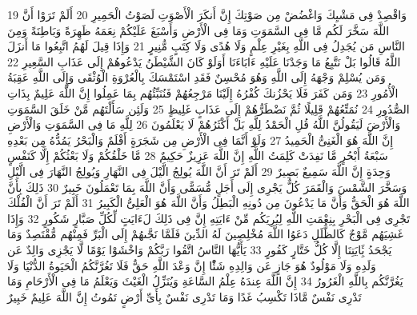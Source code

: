 \documentclass[20pt,a4paper]{article}
\begin{document}
{\tiny\colorbox{cl_aya}{19}} وَاقْصِدْ فِى مَشْيِكَ وَاغْضُضْ مِن صَوْتِكَ إِنَّ أَنكَرَ الْأَصْوَتِ لَصَوْتُ الْحَمِيرِ
{\tiny\colorbox{cl_aya}{20}} أَلَمْ تَرَوْا أَنَّ اللَّهَ سَخَّرَ لَكُم مَّا فِى السَّمَوَتِ وَمَا فِى الْأَرْضِ وَأَسْبَغَ عَلَيْكُمْ نِعَمَهُ ظَهِرَةً وَبَاطِنَةً وَمِنَ النَّاسِ مَن يُجَدِلُ فِى اللَّهِ بِغَيْرِ عِلْمٍ وَلَا هُدًى وَلَا كِتَبٍ مُّنِيرٍ
{\tiny\colorbox{cl_aya}{21}} وَإِذَا قِيلَ لَهُمُ اتَّبِعُوا مَا أَنزَلَ اللَّهُ قَالُوا بَلْ نَتَّبِعُ مَا وَجَدْنَا عَلَيْهِ ءَابَاءَنَا أَوَلَوْ كَانَ الشَّيْطَنُ يَدْعُوهُمْ إِلَى عَذَابِ السَّعِيرِ
{\tiny\colorbox{cl_aya}{22}} وَمَن يُسْلِمْ وَجْهَهُ إِلَى اللَّهِ وَهُوَ مُحْسِنٌ فَقَدِ اسْتَمْسَكَ بِالْعُرْوَةِ الْوُثْقَى وَإِلَى اللَّهِ عَقِبَةُ الْأُمُورِ
{\tiny\colorbox{cl_aya}{23}} وَمَن كَفَرَ فَلَا يَحْزُنكَ كُفْرُهُ إِلَيْنَا مَرْجِعُهُمْ فَنُنَبِّئُهُم بِمَا عَمِلُوا إِنَّ اللَّهَ عَلِيمٌ بِذَاتِ الصُّدُورِ
{\tiny\colorbox{cl_aya}{24}} نُمَتِّعُهُمْ قَلِيلًا ثُمَّ نَضْطَرُّهُمْ إِلَى عَذَابٍ غَلِيظٍ
{\tiny\colorbox{cl_aya}{25}} وَلَئِن سَأَلْتَهُم مَّنْ خَلَقَ السَّمَوَتِ وَالْأَرْضَ لَيَقُولُنَّ اللَّهُ قُلِ الْحَمْدُ لِلَّهِ بَلْ أَكْثَرُهُمْ لَا يَعْلَمُونَ
{\tiny\colorbox{cl_aya}{26}} لِلَّهِ مَا فِى السَّمَوَتِ وَالْأَرْضِ إِنَّ اللَّهَ هُوَ الْغَنِىُّ الْحَمِيدُ
{\tiny\colorbox{cl_aya}{27}} وَلَوْ أَنَّمَا فِى الْأَرْضِ مِن شَجَرَةٍ أَقْلَمٌ وَالْبَحْرُ يَمُدُّهُ مِن بَعْدِهِ سَبْعَةُ أَبْحُرٍ مَّا نَفِدَتْ كَلِمَتُ اللَّهِ إِنَّ اللَّهَ عَزِيزٌ حَكِيمٌ
{\tiny\colorbox{cl_aya}{28}} مَّا خَلْقُكُمْ وَلَا بَعْثُكُمْ إِلَّا كَنَفْسٍ وَحِدَةٍ إِنَّ اللَّهَ سَمِيعٌ بَصِيرٌ
{\tiny\colorbox{cl_aya}{29}} أَلَمْ تَرَ أَنَّ اللَّهَ يُولِجُ الَّيْلَ فِى النَّهَارِ وَيُولِجُ النَّهَارَ فِى الَّيْلِ وَسَخَّرَ الشَّمْسَ وَالْقَمَرَ كُلٌّ يَجْرِى إِلَى أَجَلٍ مُّسَمًّى وَأَنَّ اللَّهَ بِمَا تَعْمَلُونَ خَبِيرٌ
{\tiny\colorbox{cl_aya}{30}} ذَلِكَ بِأَنَّ اللَّهَ هُوَ الْحَقُّ وَأَنَّ مَا يَدْعُونَ مِن دُونِهِ الْبَطِلُ وَأَنَّ اللَّهَ هُوَ الْعَلِىُّ الْكَبِيرُ
{\tiny\colorbox{cl_aya}{31}} أَلَمْ تَرَ أَنَّ الْفُلْكَ تَجْرِى فِى الْبَحْرِ بِنِعْمَتِ اللَّهِ لِيُرِيَكُم مِّنْ ءَايَتِهِ إِنَّ فِى ذَلِكَ لَءَايَتٍ لِّكُلِّ صَبَّارٍ شَكُورٍ
{\tiny\colorbox{cl_aya}{32}} وَإِذَا غَشِيَهُم مَّوْجٌ كَالظُّلَلِ دَعَوُا اللَّهَ مُخْلِصِينَ لَهُ الدِّينَ فَلَمَّا نَجَّىهُمْ إِلَى الْبَرِّ فَمِنْهُم مُّقْتَصِدٌ وَمَا يَجْحَدُ بَِٔايَتِنَا إِلَّا كُلُّ خَتَّارٍ كَفُورٍ
{\tiny\colorbox{cl_aya}{33}} يَأَيُّهَا النَّاسُ اتَّقُوا رَبَّكُمْ وَاخْشَوْا يَوْمًا لَّا يَجْزِى وَالِدٌ عَن وَلَدِهِ وَلَا مَوْلُودٌ هُوَ جَازٍ عَن وَالِدِهِ شَئًْا إِنَّ وَعْدَ اللَّهِ حَقٌّ فَلَا تَغُرَّنَّكُمُ الْحَيَوةُ الدُّنْيَا وَلَا يَغُرَّنَّكُم بِاللَّهِ الْغَرُورُ
{\tiny\colorbox{cl_aya}{34}} إِنَّ اللَّهَ عِندَهُ عِلْمُ السَّاعَةِ وَيُنَزِّلُ الْغَيْثَ وَيَعْلَمُ مَا فِى الْأَرْحَامِ وَمَا تَدْرِى نَفْسٌ مَّاذَا تَكْسِبُ غَدًا وَمَا تَدْرِى نَفْسٌ بِأَىِّ أَرْضٍ تَمُوتُ إِنَّ اللَّهَ عَلِيمٌ خَبِيرٌ
\end{document}
